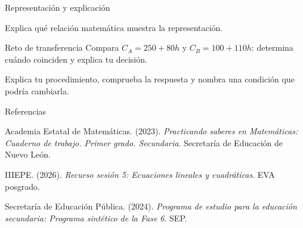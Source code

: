 \documentclass[
	spanish,
	aspectratio=1610,
	xcolor={dvipsnames,table}
]{beamer}
\begin{document}
\begin{frame}{Representación y explicación}
\centering{}\par\vspace{.15cm}\small Explica qué relación matemática muestra la representación.
\end{frame}
\begin{frame}{Reto de transferencia}
\fontsize{14}{18}\selectfont Compara $C_A=250+80h$ y $C_B=100+110h$: determina cuándo coinciden y explica tu decisión.\par\vspace{.5cm}Explica tu procedimiento, comprueba la respuesta y nombra una condición que podría cambiarla.
\end{frame}
\begin{frame}{Referencias}
\fontsize{9}{11}\selectfont\raggedright 
{\setlength{\parskip}{6pt}
\par\hangindent=1.27cm  Academia Estatal de Matemáticas. (2023). \textit{Practicando saberes en Matemáticas: Cuaderno de trabajo. Primer grado. Secundaria}. Secretaría de Educación de Nuevo León.
\par\hangindent=1.27cm  IIIEPE. (2026). \textit{Recurso sesión 5: Ecuaciones lineales y cuadráticas}. EVA posgrado.
\par\hangindent=1.27cm  Secretaría de Educación Pública. (2024). \textit{Programa de estudio para la educación secundaria: Programa sintético de la Fase 6}. SEP.
}


\end{frame}
\end{document}

